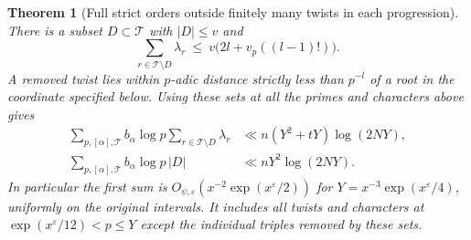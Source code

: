 \documentclass[a4paper,11pt]{article}
\newtheorem{theorem}[proposition]{Theorem}
\theoremstyle{definition}
\theoremstyle{remark}
\numberwithin{equation}{section}
\begin{document}
\begin{theorem}[Full strict orders outside finitely many twists in each progression]\leavevmode
\label{thm:weightmass309}
There is a subset \(D\subset\mathcal T\) with \(|D|\le v\) and
\[
 \sum_{r\in\mathcal T\setminus D}\lambda_r
       \ \le\ v\bigl(2l+v_p((l-1)!)\bigr).
\]
A removed twist lies within \(p\)-adic distance strictly less
than \(p^{-l}\) of a root in the coordinate specified below.
Using these sets at all the primes and characters above gives
\[
\begin{split}
 \sum_{p,[\alpha],\mathcal T} b_\alpha\log p
      \sum_{r\in\mathcal T\setminus D}\lambda_r
   &\ll n(Y^2+tY)\log(2NY),\\
 \sum_{p,[\alpha],\mathcal T} b_\alpha\log p\,|D|
   &\ll nY^2\log(2NY).
\end{split}
\]
In particular the first sum is \(O_{\psi,\varepsilon}
(x^{-2}\exp(x^\varepsilon/2))\) for
\(Y=x^{-3}\exp(x^\varepsilon/4)\), uniformly on the original
intervals. It includes all twists and characters at
\(\exp(x^\varepsilon/12)<p\le Y\) except the individual
triples removed by these sets.
\end{theorem}
\end{document}
